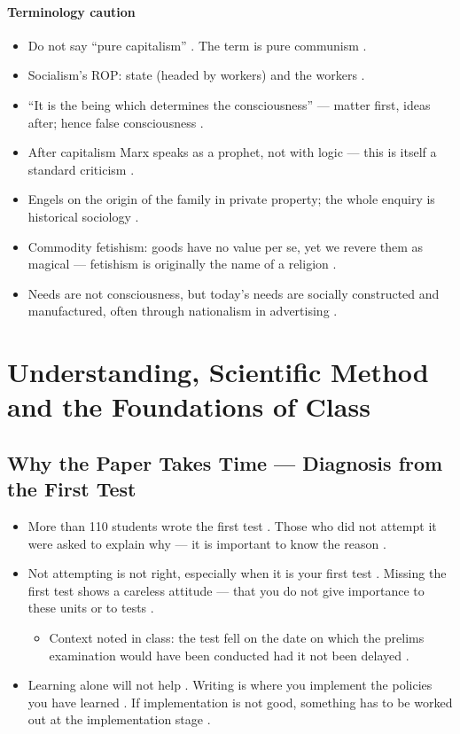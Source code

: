 \paragraph{Terminology caution}
\begin{itemize}
    \item Do not say ``pure capitalism'' . The term is pure communism .
\end{itemize}

\begin{QuickRevision}
\begin{itemize}
    \item Socialism's ROP: state (headed by workers) and the workers .
    \item ``It is the being which determines the consciousness'' --- matter first, ideas after; hence false consciousness .
    \item After capitalism Marx speaks as a prophet, not with logic --- this is itself a standard criticism .
    \item Engels on the origin of the family in private property; the whole enquiry is historical sociology .
    \item Commodity fetishism: goods have no value per se, yet we revere them as magical --- fetishism is originally the name of a religion .
    \item Needs are not consciousness, but today's needs are socially constructed and manufactured, often through nationalism in advertising .
\end{itemize}
\end{QuickRevision}

\sectiondivider

\section{Understanding, Scientific Method and the Foundations of Class}

\subsection{Why the Paper Takes Time --- Diagnosis from the First Test}
\begin{itemize}
    \item More than 110 students wrote the first test . Those who did not attempt it were asked to explain why --- it is important to know the reason .
    \item Not attempting is not right, especially when it is your first test . Missing the first test shows a careless attitude --- that you do not give importance to these units or to tests .
    \begin{itemize}
        \item Context noted in class: the test fell on the date on which the prelims examination would have been conducted had it not been delayed .
    \end{itemize}
    \item Learning alone will not help . Writing is where you implement the policies you have learned . If implementation is not good, something has to be worked out at the implementation stage .
\end{itemize}

